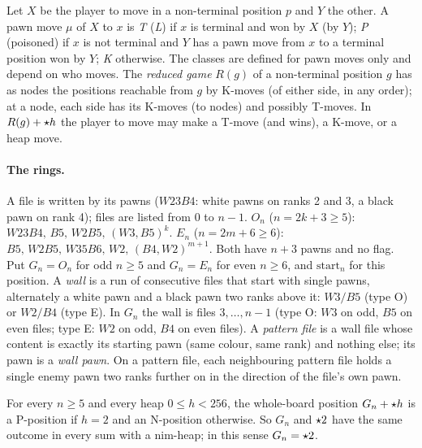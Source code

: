 \begin{wallproof}
Let $X$ be the player to move in a non-terminal position $p$ and $Y$ the other. A pawn move $\mu$ of $X$ to $x$ is \emph{T} (\emph{L}) if
$x$ is terminal and won by $X$ (by $Y$); \emph{P} (poisoned) if $x$ is not terminal and $Y$ has a pawn move from $x$ to a terminal
position won by $Y$; \emph{K} otherwise. The classes are defined for pawn moves only and depend on who moves. The \emph{reduced game}
$R(g)$ of a non-terminal position $g$ has as nodes the positions reachable from $g$ by K-moves (of either side, in any order); at a node,
each side has its K-moves (to nodes) and possibly T-moves. In $R(g)+\mathord{\star h}$ the player to move may make a T-move (and wins), a K-move,
or a heap move.

\paragraph{The rings.}
A file is written by its pawns ($W23B4$: white pawns on ranks 2 and 3, a black pawn on rank 4); files are listed from $0$ to $n-1$.
$O_n$ ($n=2k+3\ge5$): $W23B4,\,B5,\,W2B5,\,(W3,B5)^k$.\quad
$E_n$ ($n=2m+6\ge6$): $B5,\,W2B5,\,W35B6,\,W2,\,(B4,W2)^{m+1}$. Both have $n+3$ pawns and no flag.
Put $G_n=O_n$ for odd $n\ge5$ and $G_n=E_n$ for even $n\ge6$, and $\mathrm{start}_n$ for this position.
A \emph{wall} is a run of consecutive files that start with single pawns, alternately a white pawn and a black pawn two ranks above it:
$W3/B5$ (type O) or $W2/B4$ (type E). In $G_n$ the wall is files $3,\dots,n-1$ (type O: $W3$ on odd, $B5$ on even files; type E: $W2$ on
odd, $B4$ on even files). A \emph{pattern file} is a wall file whose content is exactly its starting pawn (same colour, same rank) and
nothing else; its pawn is a \emph{wall pawn}. On a pattern file, each neighbouring pattern file holds a single enemy pawn two ranks
further on in the direction of the file's own pawn.

\begin{theorem}
For every $n\ge5$ and every heap $0\le h<256$, the whole-board position $G_n+\mathord{\star h}$ is a P-position if $h=2$ and an N-position
otherwise. So $G_n$ and $\mathord{\star2}$ have the same outcome in every sum with a nim-heap; in this sense $G_n=\mathord{\star2}$.
\end{theorem}


\end{wallproof}
